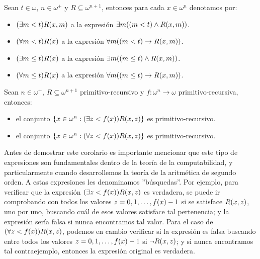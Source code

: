 \begin{notation}
	Sean $t\in\omega$, $n\in\omega^{+}$ y $R\subseteq\omega^{n + 1}$, entonces para cada $x\in\omega^{n}$ denotamos por:

	\begin{itemize}
		\item $\pa*{\exists m < t}R\pa*{x, m}$ a la expresión $\exists m\pa*{\pa*{m < t}\land R\pa*{x, m}}$.
		\item $\pa*{\forall m < t}R\pa*{x}$ a la expresión $\forall m\pa*{\pa*{m < t}\to R\pa*{x, m}}$.
		\item $\pa*{\exists m\leq t}R\pa*{x}$ a la expresión $\exists m\pa*{\pa*{m\leq t}\land R\pa*{x, m}}$.
		\item $\pa*{\forall m\leq t}R\pa*{x}$ a la expresión $\forall m\pa*{\pa*{m\leq t}\to R\pa*{x, m}}$.
	\end{itemize}
\end{notation}

\begin{coll}
	\label{coll: prim_rec_acotado}
	Sean $n\in\omega^{+}$, $R\subseteq\omega^{n + 1}$ primitivo-recursivo y $f:\omega^{n}\to\omega$ primitivo-recursiva, entonces:

	\begin{itemize}
		\item el conjunto $\set{x\in\omega^{n}:\pa*{\exists z < f\pa*{x}}R\pa*{x, z}}$ es primitivo-recursivo.
		\item el conjunto $\set{x\in\omega^{n}:\pa*{\forall z < f\pa*{x}}R\pa*{x, z}}$ es primitivo-recursivo.
	\end{itemize}
\end{coll}

Antes de demostrar este corolario es importante mencionar que este tipo de expresiones son fundamentales dentro de la teoría de la computabilidad, y particularmente cuando desarrollemos la teoría de la aritmética de segundo orden. A estas expresiones les denominamos ''búsquedas''. Por ejemplo, para verificar que la expresión $\pa*{\exists z < f\pa*{x}}R\pa*{x, z}$ es verdadera, se puede ir comprobando con todos los valores $z = 0, 1,\dotsc, f\pa*{x} - 1$ si se satisface $R\pa*{x, z}$, uno por uno, buscando cuál de esos valores satisface tal pertenencia; y la expresión sería falsa si nunca encontramos tal valor. Para el caso de $\pa*{\forall z < f\pa*{x}}R\pa*{x, z}$, podemos en cambio verificar si la expresión es falsa buscando entre todos los valores $z = 0, 1,\dotsc, f\pa*{x} - 1$ si $\lnot R\pa*{x, z}$; y si nunca encontramos tal contraejemplo, entonces la expresión original es verdadera.

